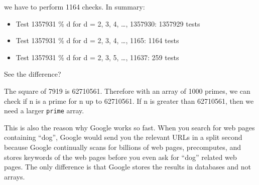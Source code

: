 we have to perform 1164 checks. In summary:

\begin{itemize}
\item
  Test 1357931 \% d for d = 2, 3, 4, \ldots, 1357930: 1357929 tests
\item
  Test 1357931 \% d for d = 2, 3, 4, \ldots, 1165: 1164 tests
\item
  Test 1357931 \% d for d = 2, 3, 5, \ldots, 11637: 259 tests
\end{itemize}

See the difference?

The square of 7919 is 62710561. Therefore with an array of 1000 primes, we can check if n is a prime for n up to 62710561. If n is greater than 62710561, then we need a larger \texttt{prime} array.

This is also the reason why Google works so fast. When you search for web pages containing ``dog'', Google would send you the relevant URLs in a split second because Google continually scans for billions of web pages, precomputes, and stores keywords of the web pages before you even ask for ``dog'' related web pages. The only difference is that Google stores the results in databases and not arrays.

